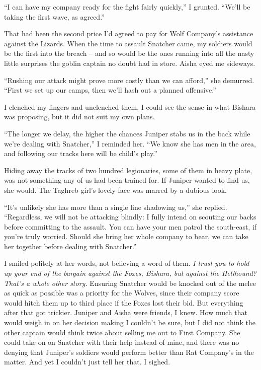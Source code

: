 \documentclass[12pt, openany]{book}
\begin{document}
“I can have my company ready for the fight fairly quickly,” I grunted. “We’ll be taking the first wave, as agreed.”

That had been the second price I’d agreed to pay for Wolf Company’s assistance against the Lizards. When the time to assault Snatcher came, my soldiers would be the first into the breach – and so would be the ones running into all the nasty little surprises the goblin captain no doubt had in store. Aisha eyed me sideways.

“Rushing our attack might prove more costly than we can afford,” she demurred. “First we set up our camps, then we’ll hash out a planned offensive.”

I clenched my fingers and unclenched them. I could see the sense in what Bishara was proposing, but it did not suit my own plans. 

“The longer we delay, the higher the chances Juniper stabs us in the back while we’re dealing with Snatcher,” I reminded her. “We know she has men in the area, and following our tracks here will be child’s play.”

Hiding away the tracks of two hundred legionaries, some of them in heavy plate, was not something any of us had been trained for. If Juniper wanted to find us, she would. The Taghreb girl’s lovely face was marred by a dubious look.

“It’s unlikely she has more than a single line shadowing us,” she replied. “Regardless, we will not be attacking blindly: I fully intend on scouting our backs before committing to the assault. You can have your men patrol the south-east, if you’re truly worried. Should she bring her whole company to bear, we can take her together before dealing with Snatcher.”

I smiled politely at her words, not believing a word of them. \textit{I trust you to hold up your end of the bargain against the Foxes, Bishara, but against the Hellhound? That’s a whole other story.} Ensuring Snatcher would be knocked out of the melee as quick as possible was a priority for the Wolves, since their company score would hitch them up to third place if the Foxes lost their bid. But everything after that got trickier. Juniper and Aisha were friends, I knew. How much that would weigh in on her decision making I couldn’t be sure, but I did not think the other captain would think twice about selling me out to First Company. She could take on on Snatcher with their help instead of mine, and there was no denying that Juniper’s soldiers would perform better than Rat Company’s in the matter. And yet I couldn’t just tell her that. I sighed.
\end{document}
